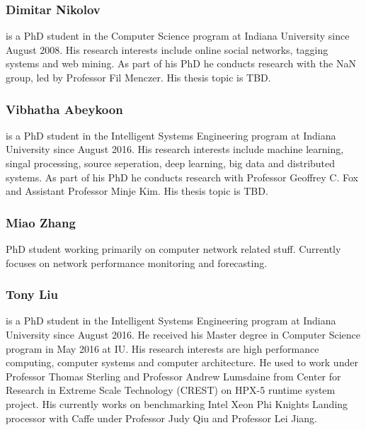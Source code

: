 \subsubsection{Dimitar Nikolov}
\label{\detokenize{i524/preface/instructors:dimitar-nikolov}}
\noindent{}

 is a PhD student in the Computer Science program at
Indiana University since August 2008. His research interests include
online social networks, tagging systems and web mining. As part of his
PhD he conducts research with the NaN group, led by Professor Fil
Menczer. His thesis topic is TBD.


\subsubsection{Vibhatha Abeykoon}
\label{\detokenize{i524/preface/instructors:vibhatha-abeykoon}}
\noindent{}

 is a PhD student in the Intelligent Systems Engineering program at
Indiana University since August 2016. His research interests include
machine learning, singal processing, source seperation, deep learning, big data and distributed systems. As part of his
PhD he conducts research with Professor Geoffrey C. Fox and Assistant Professor Minje Kim. His thesis topic is TBD.


\subsubsection{Miao Zhang}
\label{\detokenize{i524/preface/instructors:miao-zhang}}
\noindent{}

 PhD student working primarily on computer network related stuff.
Currently focuses on network performance monitoring and forecasting.


\subsubsection{Tony Liu}
\label{\detokenize{i524/preface/instructors:tony-liu}}
\noindent{}

 is a PhD student in the Intelligent Systems Engineering program at Indiana University since August 2016. He received his Master degree in Computer Science program in May 2016 at IU. His research interests are high performance computing, computer systems and computer architecture. He used to work under Professor Thomas Sterling and Professor Andrew Lumsdaine from Center for Research in Extreme Scale Technology (CREST) on HPX-5 runtime system project. His currently works on benchmarking Intel Xeon Phi Knights Landing processor with Caffe under Professor Judy Qiu and Professor Lei Jiang.


